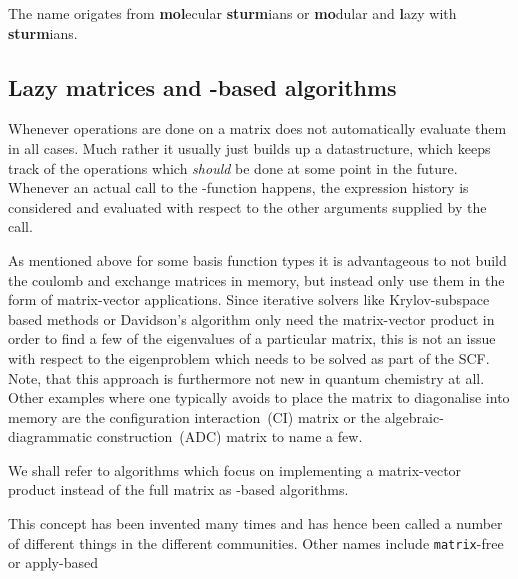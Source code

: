The name \molsturm origates from \textbf{mol}ecular \textbf{sturm}ians
or \textbf{mo}dular and \textbf{l}azy with \textbf{sturm}ians.



\subsection{Lazy matrices and \contraction-based algorithms}
\label{sec:lazymat}

Whenever operations are done on a matrix \lazyten does not automatically
evaluate them in all cases.
Much rather it usually just builds up a datastructure,
which keeps track of the operations which \textit{should} be done
at some point in the future.
Whenever an actual call to the \contraction-function happens,
the expression history is considered and evaluated with respect
to the other arguments supplied by the \contraction call.



As mentioned above for some basis function types it is advantageous
to not build the coulomb and exchange matrices in memory,
but instead only use them in the form of matrix-vector applications.
Since iterative solvers like Krylov-subspace based methods or Davidson's algorithm
only need the matrix-vector product in order to find a few of the eigenvalues
of a particular matrix,
this is not an issue with respect to the eigenproblem which needs to be solved
as part of the SCF.
Note, that this approach is furthermore not new in quantum chemistry at all.
Other examples where one typically avoids to place the matrix to diagonalise
into memory are the configuration interaction~(CI) matrix
or the algebraic-diagrammatic construction~(ADC) matrix to name a few.

We shall refer to algorithms which focus on implementing a matrix-vector product
instead of the full matrix as \contraction-based algorithms.

This concept has been invented many times
and has hence been called a number of different things
in the different communities.
Other names include \texttt{matrix}-free
or apply-based


